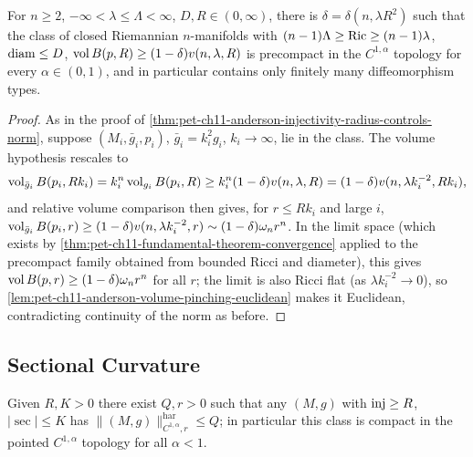 \begin{corollary}
  \label{cor:pet-ch11-volume-pinching-precompactness}
  For $n\ge2$, $-\infty<\lambda\le\Lambda<\infty$, $D,R\in(0,\infty)$, there
  is $\delta=\delta(n,\lambda R^2)$ such that the class of closed Riemannian
  $n$-manifolds with $(n-1)\Lambda\ge\operatorname{Ric}\ge(n-1)\lambda$, $\operatorname{diam}\le D$,
  $\operatorname{vol} B(p,R)\ge(1-\delta)v(n,\lambda,R)$ is precompact in the $C^{1,\alpha}$
  topology for every $\alpha\in(0,1)$, and in particular contains only
  finitely many diffeomorphism types.
\end{corollary}
\begin{proof}
  As in the proof of \cref{thm:pet-ch11-anderson-injectivity-radius-controls-norm},
  suppose $(M_i,\bar g_i,p_i)$, $\bar g_i=k_i^2g_i$, $k_i\to\infty$, lie in
  the class. The volume hypothesis rescales to
  \[
    \operatorname{vol}_{\bar g_i}B(p_i,Rk_i)=k_i^n\operatorname{vol}_{g_i}B(p_i,R)\ge k_i^n(1-\delta)v(n,\lambda,R)
    =(1-\delta)v(n,\lambda k_i^{-2},Rk_i),
  \]
  and relative volume comparison then gives, for $r\le Rk_i$ and large $i$,
  $\operatorname{vol}_{\bar g_i}B(p_i,r)\ge(1-\delta)v(n,\lambda k_i^{-2},r)\sim(1-\delta)\omega_nr^n$.
  In the limit space (which exists by
  \cref{thm:pet-ch11-fundamental-theorem-convergence} applied to the
  precompact family obtained from bounded Ricci and diameter), this gives
  $\operatorname{vol} B(p,r)\ge(1-\delta)\omega_nr^n$ for all $r$; the limit is also Ricci
  flat (as $\lambda k_i^{-2}\to0$), so
  \cref{lem:pet-ch11-anderson-volume-pinching-euclidean} makes it Euclidean,
  contradicting continuity of the norm as before.
\end{proof}

\subsection{Sectional Curvature}

\begin{theorem}
  \label{thm:pet-ch11-convergence-theorem-riemannian-geometry}
  Given $R,K>0$ there exist $Q,r>0$ such that any $(M,g)$ with $\operatorname{inj}\ge R$,
  $|\sec|\le K$ has $\|(M,g)\|^{\mathrm{har}}_{C^{1,\alpha},r}\le Q$; in
  particular this class is compact in the pointed $C^{1,\alpha}$ topology for
  all $\alpha<1$.
\end{theorem}

